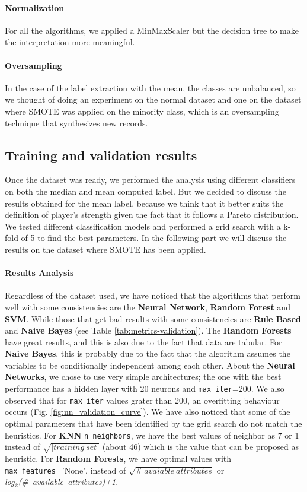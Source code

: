 \paragraph{Normalization}
For all the algorithms, we applied a MinMaxScaler but the decision tree to make the interpretation more meaningful.

\paragraph{Oversampling}
In the case of the label extraction with the mean, the classes are unbalanced, so we thought of doing an experiment on the normal dataset and one on the dataset where SMOTE was applied on the minority class, which is an oversampling technique that synthesizes new records.


\subsection{Training and validation results}
Once the dataset was ready, we performed the analysis using different classifiers on both the median and mean computed label. But we decided to discuss the results obtained for the mean label, because we think that it better suits the definition of player's strength given the fact that it follows a Pareto distribution.
We tested different classification models and performed a grid search with a k-fold of 5 to find the best parameters. In the following part we will discuss the results on the dataset where SMOTE has been applied.

\paragraph{Results Analysis}
Regardless of the dataset used, we have noticed that the algorithms that perform well with some consistencies are the \textbf{Neural Network}, \textbf{Random Forest} and \textbf{SVM}. While those that get bad results with some consistencies are \textbf{Rule Based} and \textbf{Naive Bayes} (see Table \ref{tab:metrics-validation}).
The \textbf{Random Forests} have great results, and this is also due to the fact that data are tabular.
For \textbf{Naive Bayes}, this is probably due to the fact that the algorithm assumes the variables to be conditionally independent among each other.
About the \textbf{Neural Networks}, we chose to use very simple architectures; the one with the best performance has a hidden layer with 20 neurons and \verb|max_iter|=200. We also observed that for \verb|max_iter| values grater than 200, an overfitting behaviour occurs (Fig. \ref{fig:nn_validation_curve}).
We have also noticed that some of the optimal parameters that have been identified by the grid search do not match the heuristics. For \textbf{KNN} \verb|n_neighbors|, we have the best values of neighbor as 7 or 1 instead of $\sqrt{|training\ set|}$ (about 46) which is the value that can be proposed as heuristic. For \textbf{Random Forests}, we have optimal values with \verb|max_features|='None', instead of $\sqrt{\#\ avaiable\ attributes}$ or \textit{log\textsubscript{2}(\#\ available\ attributes)+1}.

